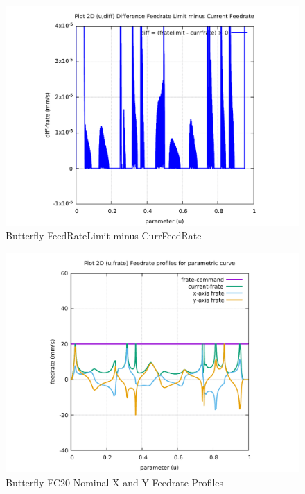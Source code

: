 \begin{figure}
	\caption     {Butterfly FeedRateLimit minus CurrFeedRate}
	\label{12-img-Butterfly-FeedRateLimit-minus-CurrFeedRate.pdf}
	\includegraphics[width=1.00\textwidth]{Chap4/appendix/app-Butterfly/plots/12-img-Butterfly-FeedRateLimit-minus-CurrFeedRate.pdf}
\end{figure}

\clearpage
\pagebreak

\begin{figure}
	\caption     {Butterfly FC20-Nominal X and Y Feedrate Profiles}
	\label{13-img-Butterfly-FC20-Nominal-X-and-Y-Feedrate-Profiles.pdf}
	\includegraphics[width=1.00\textwidth]{Chap4/appendix/app-Butterfly/plots/13-img-Butterfly-FC20-Nominal-X-and-Y-Feedrate-Profiles.pdf}
\end{figure}


